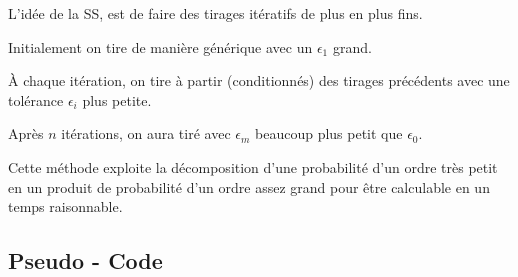\documentclass[french,12pt]{article}
\begin{document}
L'idée de la SS, est de faire des tirages itératifs de plus en plus fins.

Initialement on tire de manière générique avec un $\epsilon_1$ grand.

À chaque itération, on tire à partir (conditionnés) des tirages précédents avec une tolérance $\epsilon_i$ plus petite.

Après $n$ itérations, on aura tiré avec $\epsilon_m$ beaucoup plus petit que $\epsilon_0$.

Cette méthode exploite la décomposition d'une probabilité d'un ordre très petit
en un produit de probabilité d'un ordre assez grand pour être calculable en un temps raisonnable.



\subsection{Pseudo - Code}

\end{document}
